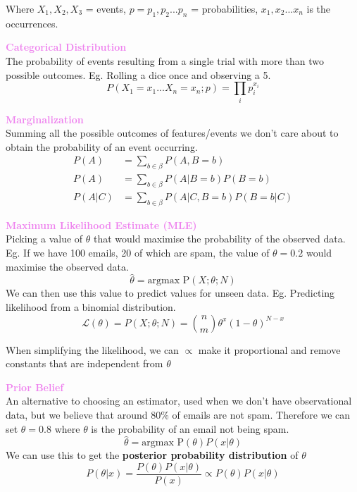 \documentclass[a4paper,10pt]{article}
\begin{document}
\noindent Where $X_{1}, X_{2}, X_{3}$ = events, $p = p_{1}, p_{2}...p_{n}$ = probabilities, $x_{1}, x_{2} ... x_{n}$ is the occurrences. 
\begin{shaded}
	\noindent \textcolor{Violet}{\textbf{Categorical Distribution}}\\	
	The probability of events resulting from a single trial with more than two possible outcomes. Eg. Rolling a dice once and observing a 5. 
	\begin{equation*}
		P(X_{1} = x_{1} ... X_{n} = x_{n}; p) = \prod_{i}p_{i}^{x_{i}}
	\end{equation*}
\end{shaded}
\begin{shaded}
	\noindent \textcolor{Violet}{\textbf{Marginalization}}\\	
	Summing all the possible outcomes of features/events we don't care about to obtain the probability of an event occurring. 
	\begin{align*}
		P(A) &= \sum_{b \in \beta}P(A, B = b) \\
		P(A) &=\sum_{b \in \beta}P(A|B=b)P(B=b) \\
		P(A|C) &= \sum_{b \in \beta}P(A|C, B=b)P(B=b|C)
	\end{align*}
\end{shaded}
\begin{shaded}
	\noindent \textcolor{Violet}{\textbf{Maximum Likelihood Estimate (MLE)}}\\
	Picking a value of $\theta$ that would maximise the probability of the observed data. Eg. If we have 100 emails, 20 of which are spam, the value of $\theta = 0.2$ would maximise the observed data. 
	\begin{equation*}
		\hat{\theta} = \text{argmax P}(X; \theta; N)
	\end{equation*}
	We can then use this value to predict values for unseen data. Eg. Predicting likelihood from a binomial distribution. 
	\begin{equation*}
		\mathcal{L}(\theta) = P(X;\theta;N) = {n \choose m} \theta^{x} (1-\theta)^{N-x}
	\end{equation*}
\end{shaded}
\noindent When simplifying the likelihood, we can $\propto$ make it proportional and remove constants that are independent from $\theta$
\begin{shaded}
	\noindent \textcolor{Violet}{\textbf{Prior Belief}}\\
	An alternative to choosing an estimator, used when we don't have observational data, but we believe that around 80\% of emails are not spam. Therefore we can set $\theta = 0.8$ where $\theta$ is the probability of an email not being spam. 
	\begin{equation*}
		\hat{\theta} = \text{argmax P}(\theta)P(x|\theta)
	\end{equation*}
	We can use this to get the \textbf{posterior probability distribution} of $\theta$
	\begin{equation*}
		P(\theta|x) = \frac{P(\theta)P(x|\theta)}{P(x)} \propto P(\theta)P(x|\theta)
	\end{equation*}	
\end{shaded}
\newpage
\end{document}
